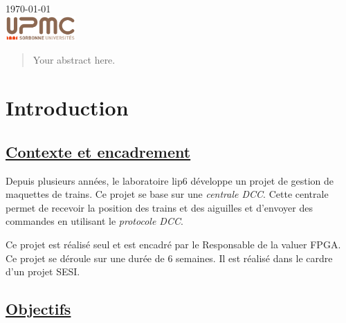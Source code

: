 \begin{titlepage}
{\large \today}\\[2cm] %


\includegraphics[width=0.2\textwidth]{logo.png}


\vfill %

\end{titlepage}



\begin{abstract}
Your abstract here.
\end{abstract}

\section{Introduction}
\label{sec:introduction}

\subsection{\underline{ Contexte et encadrement}}

Depuis plusieurs ann\'ees, le laboratoire lip6 d\'eveloppe un projet de
gestion de maquettes de trains. Ce projet se base sur une
\emph{centrale DCC}. Cette centrale permet de recevoir la position des
trains et des aiguilles et d'envoyer des commandes en utilisant le
\emph{protocole DCC}.

Ce projet est r\'ealis\'e seul et est encadr\'e par le Responsable de la
valuer FPGA. Ce projet se d\'eroule sur une dur\'ee de 6 semaines.
Il est r\'ealis\'e dans le cardre d'un projet SESI.

\subsection{\underline{Objectifs}}

